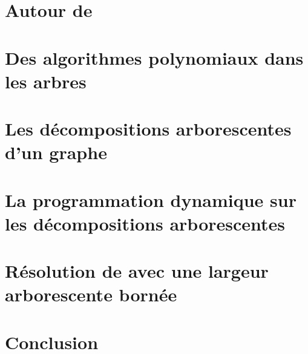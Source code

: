 
\tableofcontents

\clearpage



\chapter{Autour de \hcycle}
\label{about_hcycle}


\chapter{Des algorithmes polynomiaux dans les arbres}
\label{tree_why}


\chapter{Les décompositions arborescentes d'un graphe}
\label{treewidth}


\chapter{La programmation dynamique sur les décompositions arborescentes}
\label{progdyn}


\chapter{Résolution de \hcycle avec une largeur arborescente bornée}
\label{hcycle_tw}



\chapter{Conclusion}
\label{open}


